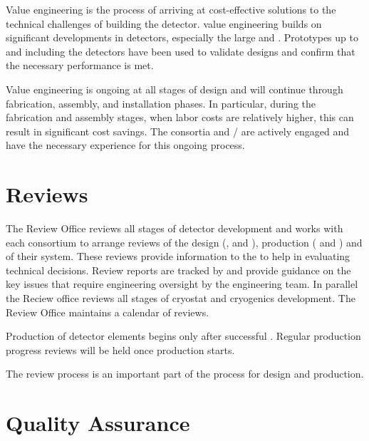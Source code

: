 Value engineering is the process of arriving at cost-effective
solutions to the technical challenges of building the 
detector.  value engineering builds on significant
developments in  detectors,  
especially the large   and
. Prototypes up to and including the  
detectors have been used to validate
 designs and confirm that the necessary performance is
met.

Value engineering is ongoing at all stages of design and will continue
through fabrication, assembly, and installation phases. In
particular, during the fabrication and assembly stages, when labor costs
are relatively higher, this can result in significant cost savings.  The
consortia and / are actively engaged and have the necessary
experience for this ongoing process.

\section{Reviews}
\label{sec:es-tc-reviews}

The   Review Office reviews all stages of
detector development and works with each consortium to arrange reviews
of the design (,  and ), production
( and ) and  of their system. These
reviews provide information to the  to help in evaluating
technical decisions.  Review reports are tracked by  and
provide guidance on the key issues that require engineering oversight
by the  engineering team. In parallel the Reciew office
reviews all stages of  cryostat and cryogenics
development. The Review Office maintains a calendar of 
reviews.


Production of detector elements begins only after successful
. Regular production progress reviews will be held once
production starts. 

The review process is an important part of the  
process for design and production.

\section{Quality Assurance}
\label{sec:es-tc-qa}

